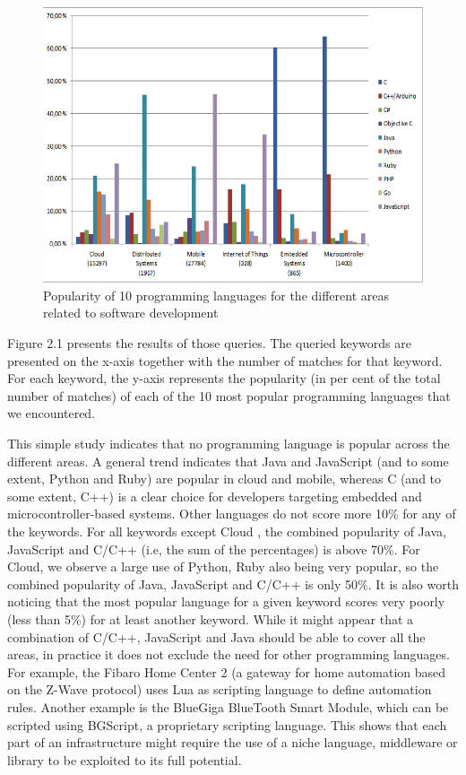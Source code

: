 \begin{figure}[h]
	\center
	\includegraphics[scale=1.]{Background/fig/github}
	\caption{Popularity of 10 programming languages for the different areas related to software development}
\end{figure}

Figure 2.1 presents the results of those queries. The queried keywords are presented on the x-axis together with the number of matches for that keyword. For each keyword, the y-axis represents the popularity (in per cent of the total number of matches) of each of the 10 most popular programming languages that we encountered.


This simple study indicates that no programming language is popular across the different areas. A general trend indicates that Java and JavaScript (and to some extent, Python and Ruby) are popular in cloud and mobile, whereas C (and to some extent, C++) is a clear choice for developers targeting embedded and microcontroller-based systems. Other languages do not score more 10\% for any of the keywords. 
For all keywords except Cloud , the combined popularity of Java, JavaScript and C/C++ (i.e, the sum
of the percentages) is above 70\%. For Cloud, we observe a large use of Python, Ruby also being very popular, so the combined popularity of Java, JavaScript and C/C++ is only 50\%. It is also worth noticing that the most popular language for a given keyword scores very poorly (less than 5\%) for at least another keyword. While it might appear that a combination of C/C++, JavaScript and Java should be able to cover all the areas, in practice it does not exclude the need for other programming languages. For example, the Fibaro Home Center 2 (a gateway for home automation based on the Z-Wave protocol) uses Lua as scripting language to define automation rules. Another example is the BlueGiga BlueTooth Smart Module, which can be scripted using BGScript, a proprietary scripting language. This shows that each part of an infrastructure might require the use of a niche language, middleware or library to be exploited to its full potential.


